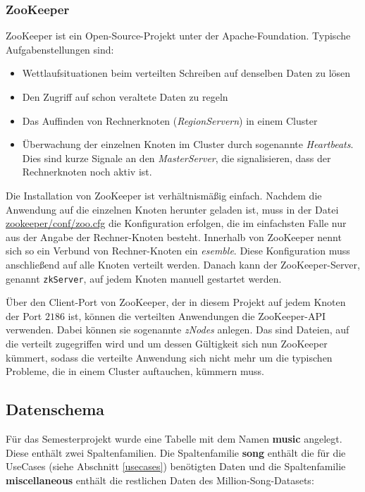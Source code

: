 \subsubsection{ZooKeeper}\label{zook}
ZooKeeper ist ein Open-Source-Projekt unter der Apache-Foundation. Typische Aufgabenstellungen sind:
\begin{itemize}
\item Wettlaufsituationen beim verteilten Schreiben auf denselben Daten zu lösen
\item Den Zugriff auf schon veraltete Daten zu regeln 
\item Das Auffinden von Rechnerknoten (\textit{RegionServern}) in einem Cluster
\item Überwachung der einzelnen Knoten im Cluster durch sogenannte \textit{Heartbeats}. Dies sind kurze Signale an den  \textit{MasterServer}, die signalisieren, dass der Rechnerknoten noch aktiv ist. 
\end{itemize}

Die Installation von ZooKeeper ist verhältnismäßig einfach. Nachdem die Anwendung auf die einzelnen Knoten herunter geladen ist, muss in der Datei \url{zookeeper/conf/zoo.cfg}
die Konfiguration erfolgen, die im einfachsten Falle nur aus der Angabe der Rechner-Knoten besteht. Innerhalb von ZooKeeper nennt sich so ein Verbund
von Rechner-Knoten ein \textit{esemble}. Diese Konfiguration muss anschließend auf alle Knoten verteilt werden. Danach kann der ZooKeeper-Server, genannt \texttt{zkServer},
auf jedem Knoten manuell gestartet werden. 

Über den Client-Port von ZooKeeper, der in diesem Projekt auf jedem Knoten der Port $2186$ ist, können die verteilten
Anwendungen die ZooKeeper-API verwenden. Dabei können sie sogenannte \textit{zNodes} anlegen. Das sind Dateien, auf die verteilt zugegriffen wird und um dessen
Gültigkeit sich nun ZooKeeper kümmert, sodass die verteilte Anwendung sich nicht mehr um die typischen Probleme, die in einem Cluster auftauchen, kümmern muss.


\subsection{Datenschema}\label{hbase_datenschema}
Für das Semesterprojekt wurde eine Tabelle mit dem Namen \textbf{music} angelegt. Diese enthält zwei Spaltenfamilien. Die Spaltenfamilie \textbf{song} enthält die für die UseCases (siehe Abschnitt \ref{usecases}) benötigten Daten und die Spaltenfamilie
\textbf{miscellaneous} enthält die restlichen Daten des Million-Song-Datasets:

